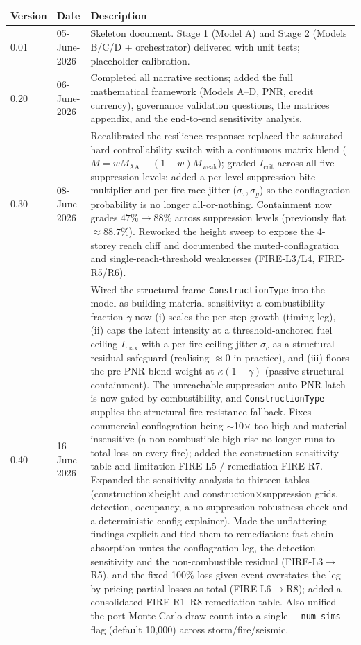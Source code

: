 \documentclass[11pt,a4paper]{article}
\begin{document}
\begin{tabular}{ll p{}}
\toprule
Version & Date & Description \\
\midrule
0.01 & 05-June-2026 & Skeleton document. Stage 1 (Model A) and Stage 2 (Models B/C/D + orchestrator) delivered with unit tests; placeholder calibration. \\
0.20 & 06-June-2026 & Completed all narrative sections; added the full mathematical framework (Models A--D, PNR, credit currency), governance validation questions, the matrices appendix, and the end-to-end sensitivity analysis. \\
0.30 & 08-June-2026 & Recalibrated the resilience response: replaced the saturated hard controllability switch with a continuous matrix blend ($M=wM_{\text{AA}}+(1-w)M_{\text{weak}}$); graded $I_{\text{crit}}$ across all five suppression levels; added a per-level suppression-bite multiplier and per-fire race jitter ($\sigma_\tau,\sigma_g$) so the conflagration probability is no longer all-or-nothing. Containment now grades $47\%\!\to\!88\%$ across suppression levels (previously flat $\approx 88.7\%$). Reworked the height sweep to expose the 4-storey reach cliff and documented the muted-conflagration and single-reach-threshold weaknesses (FIRE-L3/L4, FIRE-R5/R6). \\
0.40 & 16-June-2026 & Wired the structural-frame \texttt{ConstructionType} into the model as building-material sensitivity: a combustibility fraction $\gamma$ now (i) scales the per-step growth (timing leg), (ii) caps the latent intensity at a threshold-anchored fuel ceiling $I_{\max}$ with a per-fire ceiling jitter $\sigma_c$ as a structural residual safeguard (realising $\approx0$ in practice), and (iii) floors the pre-PNR blend weight at $\kappa(1-\gamma)$ (passive structural containment). The unreachable-suppression auto-PNR latch is now gated by combustibility, and \texttt{ConstructionType} supplies the structural-fire-resistance fallback. Fixes commercial conflagration being $\sim$10$\times$ too high and material-insensitive (a non-combustible high-rise no longer runs to total loss on every fire); added the construction sensitivity table and limitation FIRE-L5 / remediation FIRE-R7. Expanded the sensitivity analysis to thirteen tables (construction$\times$height and construction$\times$suppression grids, detection, occupancy, a no-suppression robustness check and a deterministic config explainer). Made the unflattering findings explicit and tied them to remediation: fast chain absorption mutes the conflagration leg, the detection sensitivity and the non-combustible residual (FIRE-L3$\rightarrow$R5), and the fixed 100\% loss-given-event overstates the leg by pricing partial losses as total (FIRE-L6$\rightarrow$R8); added a consolidated FIRE-R1--R8 remediation table. Also unified the port Monte Carlo draw count into a single \texttt{-{}-num-sims} flag (default 10{,}000) across storm/fire/seismic. \\
\bottomrule
\end{tabular}
\end{document}

